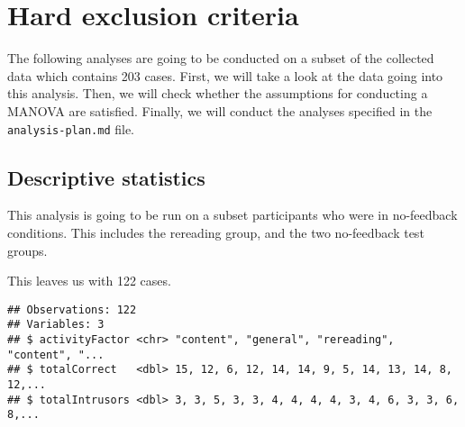 \documentclass[12pt,]{article}
\newenvironment{Shaded}{\begin{snugshade}}{\end{snugshade}}
\newcommand{\CommentTok}[1]{\textcolor[rgb]{0.56,0.35,0.01}{\textit{#1}}}
\newcommand{\KeywordTok}[1]{\textcolor[rgb]{0.13,0.29,0.53}{\textbf{#1}}}
\newcommand{\NormalTok}[1]{#1}
\newcommand{\OperatorTok}[1]{\textcolor[rgb]{0.81,0.36,0.00}{\textbf{#1}}}
\newcommand{\StringTok}[1]{\textcolor[rgb]{0.31,0.60,0.02}{#1}}
\begin{document}
\hypertarget{hard-exclusion-criteria}{%
\section{Hard exclusion criteria}\label{hard-exclusion-criteria}}

The following analyses are going to be conducted on a subset of the
collected data which contains 203 cases. First, we will take a look at
the data going into this analysis. Then, we will check whether the
assumptions for conducting a MANOVA are satisfied. Finally, we will
conduct the analyses specified in the \texttt{analysis-plan.md} file.

\hypertarget{descriptive-statistics}{%
\subsection{Descriptive statistics}\label{descriptive-statistics}}

This analysis is going to be run on a subset participants who were in
no-feedback conditions. This includes the rereading group, and the two
no-feedback test groups.

\begin{Shaded}
\end{Shaded}

This leaves us with 122 cases.

\begin{Shaded}
\end{Shaded}

\begin{verbatim}
## Observations: 122
## Variables: 3
## $ activityFactor <chr> "content", "general", "rereading", "content", "...
## $ totalCorrect   <dbl> 15, 12, 6, 12, 14, 14, 9, 5, 14, 13, 14, 8, 12,...
## $ totalIntrusors <dbl> 3, 3, 5, 3, 3, 4, 4, 4, 4, 3, 4, 6, 3, 3, 6, 8,...
\end{verbatim}
\end{document}
